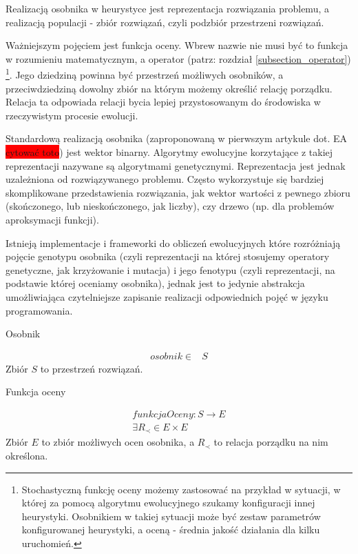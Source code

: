\documentclass[twoside]{iisthesis}
\newcommand{\todo}{\colorbox{red}}
\begin{document}
Realizacją osobnika w heurystyce jest reprezentacja rozwiązania problemu, a realizacją populacji - zbiór rozwiązań, czyli podzbiór przestrzeni rozwiązań.

Ważniejszym pojęciem jest funkcja oceny. Wbrew nazwie nie musi być to funkcja w rozumieniu matematycznym, a operator (patrz: rozdział \ref{subsection_operator}) \footnote{Stochastyczną funkcję oceny możemy zastosować na przykład w sytuacji, w której za pomocą algorytmu ewolucyjnego szukamy konfiguracji innej heurystyki. Osobnikiem w takiej sytuacji może być zestaw parametrów konfigurowanej heurystyki, a oceną - średnia jakość działania dla kilku uruchomień.}. Jego dziedziną powinna być przestrzeń możliwych osobników, a przeciwdziedziną dowolny zbiór na którym możemy określić relację porządku. Relacja ta odpowiada relacji bycia lepiej przystosowanym do środowiska w rzeczywistym procesie ewolucji.

Standardową realizacją osobnika (zaproponowaną w pierwszym artykule dot. EA \todo{cytować toto}) jest wektor binarny. Algorytmy ewolucyjne korzytające z takiej reprezentacji nazywane są algorytmami genetycznymi. Reprezentacja jest jednak uzależniona od rozwiązywanego problemu. Często wykorzystuje się bardziej skomplikowane przedstawienia rozwiązania, jak wektor wartości z pewnego zbioru (skończonego, lub nieskończonego, jak liczby), czy drzewo (np. dla problemów aproksymacji funkcji).

Istnieją implementacje i frameworki do obliczeń ewolucyjnych które rozróżniają pojęcie genotypu osobnika (czyli reprezentacji na której stosujemy operatory genetyczne, jak krzyżowanie i mutacja) i jego fenotypu (czyli reprezentacji, na podstawie której oceniamy osobnika), jednak jest to jedynie abstrakcja umożliwiająca czytelniejsze zapisanie realizacji odpowiednich pojęć w języku programowania.

\begin{signature}
	\caption{Osobnik \label{signature_specimen}}
	\begin{align}
	osobnik \in &S
	\end{align}
	Zbiór $S$ to przestrzeń rozwiązań.
\end{signature}

\begin{signature}
	\caption{Funkcja oceny \label{signature_eval}}
	\begin{align}
		funkcjaOceny: S \rightarrow E \\
		\exists R_{\prec} \in E \times E
	\end{align}
	Zbiór $E$ to zbiór możliwych ocen osobnika, 
	a $R_{\prec}$ to relacja porządku na nim określona. 
\end{signature}
\end{document}
